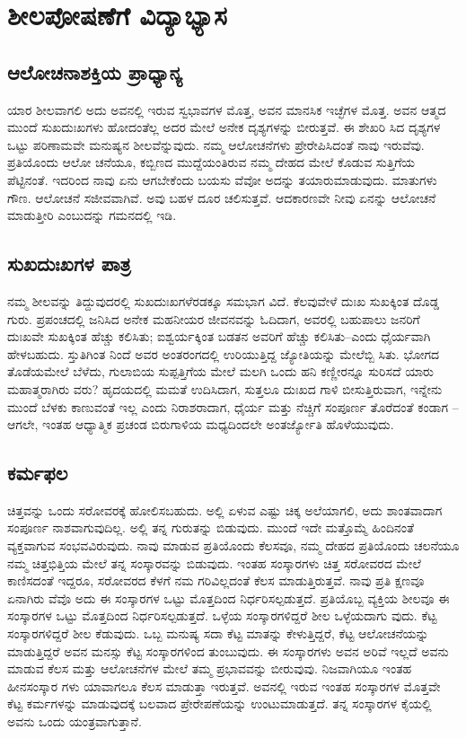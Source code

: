 
\chapter{ಶೀಲಪೋಷಣೆಗೆ ವಿದ್ಯಾಭ್ಯಾಸ}

\section{ಆಲೋಚನಾಶಕ್ತಿಯ ಪ್ರಾಧ್ಯಾನ್ಯ}

ಯಾರ ಶೀಲವಾಗಲಿ ಅದು ಅವನಲ್ಲಿ ಇರುವ ಸ್ವಭಾವಗಳ ಮೊತ್ತ, ಅವನ ಮಾನಸಿಕ ಇಚ್ಛೆಗಳ ಮೊತ್ತ. ಅವನ ಆತ್ಮದ ಮುಂದೆ ಸುಖದುಃಖಗಳು ಹೋದಂತೆಲ್ಲ ಅದರ ಮೇಲೆ ಅನೇಕ ದೃಶ್ಯಗಳನ್ನು ಬೀರುತ್ತವೆ. ಈ ಶೇಖರಿ ಸಿದ ದೃಶ್ಯಗಳ ಒಟ್ಟು ಪರಿಣಾಮವೇ ಮನುಷ್ಯನ ಶೀಲವೆನ್ನುವುದು. ನಮ್ಮ ಆಲೋಚನೆಗಳು ಪ್ರೇರೇಪಿಸಿದಂತೆ ನಾವು ಇರುವೆವು. ಪ್ರತಿಯೊಂದು ಆಲೋ ಚನೆಯೂ, ಕಬ್ಬಿಣದ ಮುದ್ದೆಯಂತಿರುವ ನಮ್ಮ ದೇಹದ ಮೇಲೆ ಕೊಡುವ ಸುತ್ತಿಗೆಯ ಪೆಟ್ಟಿನಂತೆ. ಇದರಿಂದ ನಾವು ಏನು ಆಗಬೇಕೆಂದು ಬಯಸು ವೆವೋ ಅದನ್ನು ತಯಾರುಮಾಡುವುದು. ಮಾತುಗಳು ಗೌಣ. ಆಲೋಚನೆ ಸಜೀವವಾಗಿವೆ. ಅವು ಬಹಳ ದೂರ ಚಲಿಸುತ್ತವೆ. ಆದಕಾರಣವೇ ನೀವು ಏನನ್ನು ಆಲೋಚನೆ ಮಾಡುತ್ತೀರಿ ಎಂಬುದನ್ನು ಗಮನದಲ್ಲಿ ಇಡಿ.


\section{ಸುಖದುಃಖಗಳ ಪಾತ್ರ}

ನಮ್ಮ ಶೀಲವನ್ನು ತಿದ್ದುವುದರಲ್ಲಿ ಸುಖದುಃಖಗಳೆರಡಕ್ಕೂ ಸಮಭಾಗ ವಿದೆ. ಕೆಲವುವೇಳೆ ದುಃಖ ಸುಖಕ್ಕಿಂತ ದೊಡ್ಡ ಗುರು. ಪ್ರಪಂಚದಲ್ಲಿ ಜನಿಸಿದ ಅನೇಕ ಮಹನೀಯರ ಜೀವನವನ್ನು ಓದಿದಾಗ, ಅವರಲ್ಲಿ ಬಹುಪಾಲು ಜನರಿಗೆ ದುಃಖವೇ ಸುಖಕ್ಕಿಂತ ಹೆಚ್ಚು ಕಲಿಸಿತು; ಐಶ್ವರ್ಯಕ್ಕಿಂತ ಬಡತನ ಅವರಿಗೆ ಹೆಚ್ಚು ಕಲಿಸಿತು–ಎಂದು ಧೈರ್ಯವಾಗಿ ಹೇಳಬಹುದು. ಸ್ತುತಿಗಿಂತ ನಿಂದೆ ಅವರ ಅಂತರಂಗದಲ್ಲಿ ಉರಿಯುತ್ತಿದ್ದ ಜ್ಯೋತಿಯನ್ನು ಮೇಲೆಬ್ಬಿ ಸಿತು. ಭೋಗದ ತೊಡೆಯಮೇಲೆ ಬೆಳೆದು, ಗುಲಾಬಿಯ ಸುಪ್ಪತ್ತಿಗೆಯ ಮೇಲೆ ಮಲಗಿ ಒಂದು ಹನಿ ಕಣ್ಣೀರನ್ನೂ ಸುರಿಸದೆ ಯಾರು ಮಹಾತ್ಮರಾಗಿರು ವರು? ಹೃದಯದಲ್ಲಿ ಮಮತೆ ಉದಿಸಿದಾಗ, ಸುತ್ತಲೂ ದುಃಖದ ಗಾಳಿ ಬೀಸುತ್ತಿರುವಾಗ, ಇನ್ನೇನು ಮುಂದೆ ಬೆಳಕು ಕಾಣುವಂತೆ ಇಲ್ಲ ಎಂದು ನಿರಾಶರಾದಾಗ, ಧೈರ್ಯ ಮತ್ತು ನೆಚ್ಚಿಗೆ ಸಂಪೂರ್ಣ ತೊರೆದಂತೆ ಕಂಡಾಗ –ಆಗಲೇ, ಇಂತಹ ಆಧ್ಯಾತ್ಮಿಕ ಪ್ರಚಂಡ ಬಿರುಗಾಳಿಯ ಮಧ್ಯದಿಂದಲೇ ಅಂತರ್ಜ್ಯೋತಿ ಹೊಳೆಯುವುದು.


\section{ಕರ್ಮಫಲ}

ಚಿತ್ತವನ್ನು ಒಂದು ಸರೋವರಕ್ಕೆ ಹೋಲಿಸಬಹುದು. ಅಲ್ಲಿ ಏಳುವ ಎಷ್ಟು ಚಿಕ್ಕ ಅಲೆಯಾಗಲಿ, ಅದು ಶಾಂತವಾದಾಗ ಸಂಪೂರ್ಣ ನಾಶವಾಗುವುದಿಲ್ಲ. ಅಲ್ಲಿ ತನ್ನ ಗುರುತನ್ನು ಬಿಡುವುದು. ಮುಂದೆ ಇದೇ ಮತ್ತೊಮ್ಮೆ ಹಿಂದಿನಂತೆ ವ್ಯಕ್ತವಾಗುವ ಸಂಭವವಿರುವುದು. ನಾವು ಮಾಡುವ ಪ್ರತಿಯೊಂದು ಕೆಲಸವೂ, ನಮ್ಮ ದೇಹದ ಪ್ರತಿಯೊಂದು ಚಲನೆಯೂ ನಮ್ಮ ಚಿತ್ತಭಿತ್ತಿಯ ಮೇಲೆ ತನ್ನ ಸಂಸ್ಕಾರವನ್ನು ಬಿಡುವುದು. ಇಂತಹ ಸಂಸ್ಕಾರಗಳು ಚಿತ್ತ ಸರೋವರದ ಮೇಲೆ ಕಾಣಿಸದಂತೆ ಇದ್ದರೂ, ಸರೋವರದ ಕೆಳಗೆ ನಮ ಗರಿವಿಲ್ಲದಂತೆ ಕೆಲಸ ಮಾಡುತ್ತಿರುತ್ತವೆ. ನಾವು ಪ್ರತಿ ಕ್ಷಣವೂ ಏನಾಗಿರು ವೆವೊ ಅದು ಈ ಸಂಸ್ಕಾರಗಳ ಒಟ್ಟು ಮೊತ್ತದಿಂದ ನಿರ್ಧರಿಸಲ್ಪಡುತ್ತದೆ. ಪ್ರತಿಯೊಬ್ಬ ವ್ಯಕ್ತಿಯ ಶೀಲವೂ ಈ ಸಂಸ್ಕಾರಗಳ ಒಟ್ಟು ಮೊತ್ತದಿಂದ ನಿರ್ಧರಿಸಲ್ಪಡುತ್ತದೆ. ಒಳ್ಳೆಯ ಸಂಸ್ಕಾರಗಳಿದ್ದರೆ ಶೀಲ ಒಳ್ಳೆಯದಾಗು ವುದು. ಕೆಟ್ಟ ಸಂಸ್ಕಾರಗಳಿದ್ದರೆ ಶೀಲ ಕೆಡುವುದು. ಒಬ್ಬ ಮನುಷ್ಯ ಸದಾ ಕೆಟ್ಟ ಮಾತನ್ನು ಕೇಳುತ್ತಿದ್ದರೆ, ಕೆಟ್ಟ ಆಲೋಚನೆಯನ್ನು ಮಾಡುತ್ತಿದ್ದರೆ ಅವನ ಮನಸ್ಸು ಕೆಟ್ಟ ಸಂಸ್ಕಾರಗಳಿಂದ ತುಂಬುವುದು. ಈ ಸಂಸ್ಕಾರಗಳು ಅವನ ಅರಿವೆ ಇಲ್ಲದೆ ಅವನು ಮಾಡುವ ಕೆಲಸ ಮತ್ತು ಆಲೋಚನೆಗಳ ಮೇಲೆ ತಮ್ಮ ಪ್ರಭಾವವನ್ನು ಬೀರುವುವು. ನಿಜವಾಗಿಯೂ ಇಂತಹ ಹೀನಸಂಸ್ಕಾರ ಗಳು ಯಾವಾಗಲೂ ಕೆಲಸ ಮಾಡುತ್ತಾ ಇರುತ್ತವೆ. ಅವನಲ್ಲಿ ಇರುವ ಇಂತಹ ಸಂಸ್ಕಾರಗಳ ಮೊತ್ತವೇ ಕೆಟ್ಟ ಕರ್ಮಗಳನ್ನು ಮಾಡುವುದಕ್ಕೆ ಬಲವಾದ ಪ್ರೇರೇಪಣೆಯನ್ನು ಉಂಟುಮಾಡುತ್ತದೆ. ತನ್ನ ಸಂಸ್ಕಾರಗಳ ಕೈಯಲ್ಲಿ ಅವನು ಒಂದು ಯಂತ್ರವಾಗುತ್ತಾನೆ.


